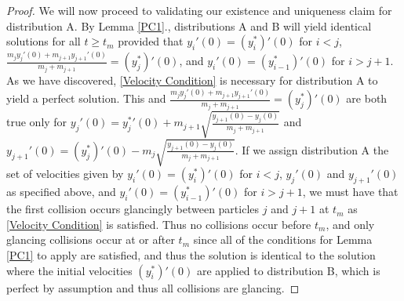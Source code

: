 \documentclass[11pt]{article}
\numberwithin{equation}{section}
\begin{document}
\begin{proof}
            We will now proceed to validating our existence and uniqueness claim for distribution A. By Lemma \ref{PC1}., distributions A and B will yield identical solutions for all $t \ge t_m$ provided that $y_i'(0) = (y_i^*)'(0)$ for $i<j$, $\frac{m_jy_j'(0) + m_{j+1}y_{j+1}'(0)}{m_j+m_{j+1}} = (y_j^*)'(0)$, and $y_i'(0) = (y_{i-1}^*)'(0)$ for $i>j+1$. As we have discovered, \eqref{Velocity Condition} is necessary for distribution A to yield a perfect solution. This and $\frac{m_jy_j'(0) + m_{j+1}y_{j+1}'(0)}{m_j+m_{j+1}} = (y_j^*)'(0)$ are both true only for $y_j'(0) = {y_j^*}'(0) + m_{j+1}\sqrt{\frac{y_{j+1}(0)-y_j(0)}{m_j+m_{j+1}}}$ and $y_{j+1}'(0) = (y_j^*)'(0) - m_{j}\sqrt{\frac{y_{j+1}(0)-y_j(0)}{m_j+m_{j+1}}}$. If we assign distribution A the set of velocities given by $y_i'(0) = (y_i^*)'(0)$ for $i<j$, $y_j'(0)$ and $y_{j+1}'(0)$ as specified above, and $y_i'(0) = (y_{i-1}^*)'(0)$ for $i>j+1$, we must have that the first collision occurs glancingly between particles $j$ and $j+1$ at $t_m$ as \eqref{Velocity Condition} is satisfied. Thus no collisions occur before $t_m$, and only glancing collisions occur at or after $t_m$ since all of the conditions for Lemma \ref{PC1} to apply are satisfied, and thus the solution is identical to the solution where the initial velocities $(y_i^*)'(0)$ are applied to distribution B, which is perfect by assumption and thus all collisions are glancing. 
            

\end{proof}
\end{document}

